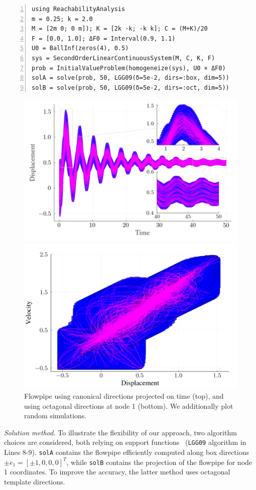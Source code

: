 \documentclass{juliacon}
\begin{document}
\begin{lstlisting}[label=ejemplo, numbers=left, aboveskip=-0.2cm, belowskip=0.8mm]
using ReachabilityAnalysis
m = 0.25; k = 2.0
M = [2m 0; 0 m]); K = [2k -k; -k k]; C = (M+K)/20
F = [0.0, 1.0]; ΔF0 = Interval(0.9, 1.1)
U0 = BallInf(zeros(4), 0.5)
sys = SecondOrderLinearContinuousSystem(M, C, K, F)
prob = InitialValueProblem(homogeneize(sys), U0 × ΔF0)
solA = solve(prob, 50, LGG09(δ=5e-2, dirs=:box, dim=5))
solB = solve(prob, 50, LGG09(δ=5e-2, dirs=:oct, dim=5))
\end{lstlisting}

\begin{figure}[tb!]
	\centering
	\includegraphics[width=0.8\linewidth,keepaspectratio]{example/displacement_vs_time}
	
	\includegraphics[width=0.8\linewidth,keepaspectratio]{example/velocity_vs_displacement}
	\caption{Flowpipe using canonical directions projected on time (top), and using octagonal directions at node 1 (bottom). We additionally plot random simulations.}
	\label{fig:example}
\end{figure}

\noindent \emph{Solution method.} To illustrate the flexibility of our approach, two algorithm choices are considered, both relying on support functions~\cite{LeGuernic2010250} (\texttt{LGG09} algorithm in Lines 8-9).
%
\texttt{solA} contains the flowpipe efficiently computed along box directions $\pm e_1 = [\pm 1, 0, 0, 0]^T$, while \texttt{solB} contains the projection of the flowpipe for node 1 coordinates. To improve the accuracy, the latter method uses octagonal template directions.
\end{document}
